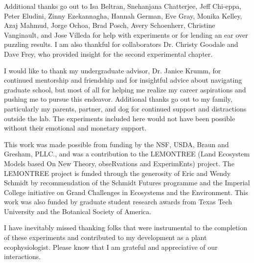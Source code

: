\documentclass{ttuthes2007}
\begin{document}
Additional thanks go out to Isa Beltran, Snehanjana Chatterjee, Jeff Chi-eppa, Peter Eludini, Zinny Ezekannagha, Hannah German, Eve Gray, Monika Kelley, Azaj Mahmud, Jorge Ochoa, Brad Posch, Avery Schoenherr, Christine Vanginault, and Jose Villeda for help with experiments or for lending an ear over puzzling results. I am also thankful for collaborators Dr. Christy Goodale and Dave Frey, who provided insight for the second experimental chapter.

I would like to thank my undergraduate advisor, Dr. Janice Krumm, for continued mentorship and friendship and for insightful advice about navigating graduate school, but most of all for helping me realize my career aspirations and pushing me to pursue this endeavor. Additional thanks go out to my family, particularly my parents, partner, and dog for continued support and distractions outside the lab. The experiments included here would not have been possible without their emotional and monetary support.

This work was made possible from funding by the NSF, USDA, Braun and Gresham, PLLC., and was a contribution to the LEMONTREE (Land Ecosystem Models based On New Theory, obseRvations and ExperimEnts) project. The LEMONTREE project is funded through the generosity of Eric and Wendy Schmidt by recommendation of the Schmidt Futures programme and the Imperial College initiative on Grand Challenges in Ecosystems and the Environment. This work was also funded by graduate student research awards from Texas Tech University and the Botanical Society of America.

I have inevitably missed thanking folks that were instrumental to the completion of these experiments and contributed to my development as a plant ecophysiologist. Please know that I am grateful and appreciative of our interactions.

\newpage
\begin{singlespace}
\tableofcontents
\end{singlespace}

\end{document}
